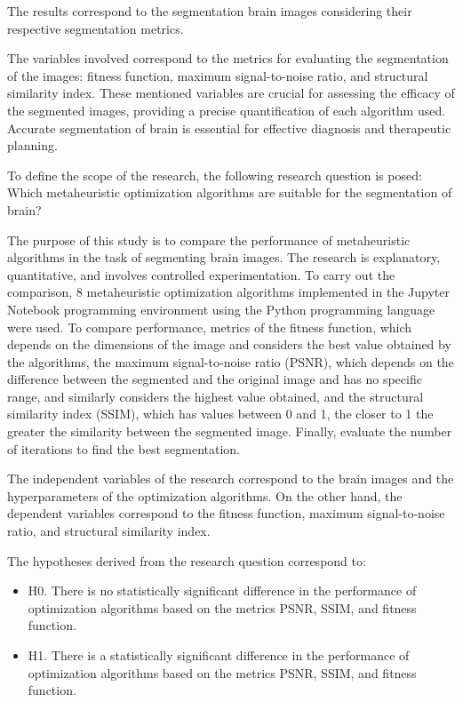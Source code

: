 \documentclass{elsarticle}
\begin{document}
\noindent The results correspond to the segmentation brain images considering their respective segmentation metrics.

\noindent The variables involved correspond to the metrics for evaluating the segmentation of the images: fitness function, maximum signal-to-noise ratio, and structural similarity index. These mentioned variables are crucial for assessing the efficacy of the segmented images, providing a precise quantification of each algorithm used. Accurate segmentation of brain is essential for effective diagnosis and therapeutic planning.

\noindent To define the scope of the research, the following research question is posed: Which metaheuristic optimization algorithms are suitable for the segmentation of brain?

\noindent The purpose of this study is to compare the performance of metaheuristic algorithms in the task of segmenting brain images. The research is explanatory, quantitative, and involves controlled experimentation. To carry out the comparison, 8 metaheuristic optimization algorithms implemented in the Jupyter Notebook programming environment using the Python programming language were used. To compare performance, metrics of the fitness function, which depends on the dimensions of the image and considers the best value obtained by the algorithms, the maximum signal-to-noise ratio (PSNR), which depends on the difference between the segmented and the original image and has no specific range, and similarly considers the highest value obtained, and the structural similarity index (SSIM), which has values between 0 and 1, the closer to 1 the greater the similarity between the segmented image. Finally, evaluate the number of iterations to find the best segmentation.

\noindent The independent variables of the research correspond to the brain images and the hyperparameters of the optimization algorithms. On the other hand, the dependent variables correspond to the fitness function, maximum signal-to-noise ratio, and structural similarity index.

\noindent The hypotheses derived from the research question correspond to:
\begin{itemize}
    \item H0. There is no statistically significant difference in the performance of optimization algorithms based on the metrics PSNR, SSIM, and fitness function.
    \item H1. There is a statistically significant difference in the performance of optimization algorithms based on the metrics PSNR, SSIM, and fitness function.
\end{itemize}
\end{document}
